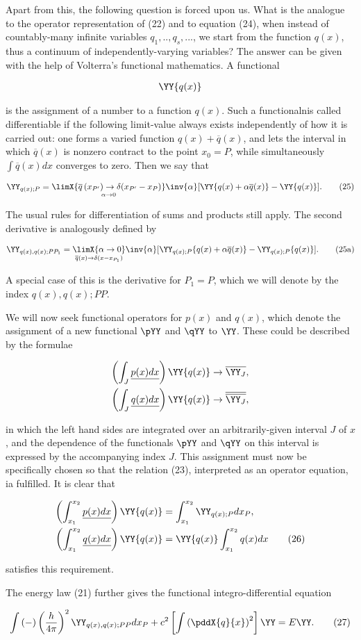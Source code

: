 \documentclass{article}
\newcommand{\nequ}[2]{
\begin{align*}
#1
\tag{#2}
\end{align*}
}
\newcommand{\uequ}[1]{
\begin{align*}
#1
\end{align*}
}
\begin{document}
Apart from this, the following question is forced upon us. What is the analogue to the operator representation of (22) and to equation (24), when instead of countably-many infinite variables $q_1,..,q_s,...$, we start from the function $q(x)$, thus a continuum of independently-varying variables? The answer can be given with the help of Volterra's functional mathematics. A functional
\uequ{
\YY\{q(x)\}
}
is the assignment of a number to a function $q(x)$. Such a functionalnis called differentiable if the following limit-value always exists independently of how it is carried out: one forms a varied function $q(x) + \overline{q}(x)$, and lets the interval in which $\overline{q}(x)$ is nonzero contract to the point $x_0=P$, while simultaneously $\int\overline{q}(x)dx$ converges to zero. Then we say that
\nequ{
\YY_{q(x);P} = \underset{\alpha\to 0}{
\limX{\overline{q}\left(x_{P'}\right) \to \delta(x_{P'} - x_P)}}
\inv{\alpha}[\YY\{q(x) + \alpha\overline{q}(x)\} - \YY\{q(x)\}].
}{25}
The usual rules for differentiation of sums and products still apply. The second derivative is analogously defined by
\nequ{
\YY_{q(x),q(x);PP_1} = \underset{\overline{q}(x) \to \delta(x - x_{P_1})}{
\limX{\alpha \to 0}
}
\inv{\alpha}[
  \YY_{q(x);P}\{q(x) + \alpha\overline{q}(x)\} - 
  \YY_{q(x);P}\{q(x)\}
].
}{25a}
A special case of this is the derivative for $P_1=P$, which we will denote by the index $q(x),q(x);PP$.

We will now seek functional operators for $p(x)$ and $q(x)$, which denote the assignment of a new functional $\pYY$ and $\qYY$ to $\YY$. These could be described by the formulae
\uequ{
\left(\int_J \underline{p(x) dx} \right)\YY\{q(x)\} &\to \overline{\YY_J},\\
\left(\int_J \underline{q(x) dx} \right)\YY\{q(x)\} &\to \overline{\overline{\YY_J}},
}
in which the left hand sides are integrated over an arbitrarily-given interval $J$ of $x$, and the dependence of the functionals $\pYY$ and $\qYY$ on this interval is expressed by the accompanying index $J$. This assignment must now be specifically chosen so that the relation (23), interpreted as an operator equation, ia fulfilled. It is clear that
\nequ{
\left(\int_{x_1}^{x_2} \underline{p(x) dx} \right)\YY\{q(x)\} &=
\int_{x_1}^{x_2}\YY_{q(x);P} dx_P,\\
\left(\int_{x_1}^{x_2} \underline{q(x) dx} \right)\YY\{q(x)\} &=
 \YY\{q(x)\}\int_{x_1}^{x_2}q(x)dx
}{26}
satisfies this requirement.

The energy law (21) further gives the functional integro-differential equation
\nequ{
\int\left(-\right)\left(\frac{h}{4\pi}\right)^2
\YY_{q(x),q(x);PP}dx_P + c^2 \left[\int\left(\pddX{q}{x}\right)^2\right]\YY = E\YY.
}{27}
\end{document}
